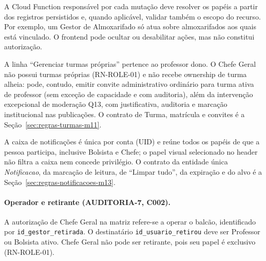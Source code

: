 \begin{explicacao}
A Cloud Function responsável por cada mutação deve resolver os papéis a partir dos registros persistidos e, quando aplicável, validar também o escopo do recurso. Por exemplo, um Gestor de Almoxarifado só atua sobre almoxarifados aos quais está vinculado. O frontend pode ocultar ou desabilitar ações, mas não constitui autorização.

A linha ``Gerenciar turmas próprias'' pertence ao professor dono. O Chefe Geral não possui turmas próprias (RN-ROLE-01) e não recebe ownership de turma alheia: pode, contudo, emitir convite administrativo ordinário para turma ativa de professor (sem exceção de capacidade e com auditoria), além da intervenção excepcional de moderação Q13, com justificativa, auditoria e marcação institucional nas publicações. O contrato de Turma, matrícula e convites é a Seção~\ref{sec:regras-turmas-m11}.

A caixa de notificações é única por conta (UID) e reúne todos os papéis de que a pessoa participa, inclusive Bolsista e Chefe; o papel visual selecionado no header não filtra a caixa nem concede privilégio. O contrato da entidade única \textit{Notificacao}, da marcação de leitura, de ``Limpar tudo'', da expiração e do alvo é a Seção~\ref{sec:regras-notificacoes-m13}.
\end{explicacao}

\paragraph{Operador e retirante (AUDITORIA-7, C002).}
A autorização de Chefe Geral na matriz refere-se a operar o balcão, identificado por \texttt{id\_gestor\_retirada}. O destinatário \texttt{id\_usuario\_retirou} deve ser Professor ou Bolsista ativo. Chefe Geral não pode ser retirante, pois seu papel é exclusivo (RN-ROLE-01).
